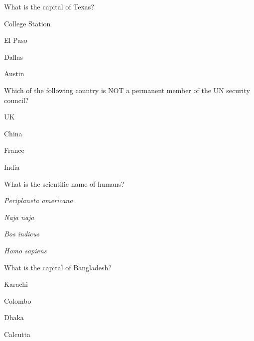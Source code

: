 \documentclass[12pt]{exam}
\begin{document}
\begin{questions}
    \question What is the capital of Texas?
    
        \begin{oneparchoices}
        
            \choice College Station
        
            \choice El Paso
        
            \choice Dallas
        
            \choice Austin
        
        \end{oneparchoices}

    \question Which of the following country is NOT a permanent member of the 
        UN security council?
    
        \begin{oneparchoices}
        
            \choice UK
        
            \choice China
        
            \choice France
        
            \choice India
        
        \end{oneparchoices}

    \question What is the scientific name of humans?
    
        \begin{oneparchoices}
        
            \choice \textit{Periplaneta americana}
        
            \choice \textit{Naja naja}
        
            \choice \textit{Bos indicus}
        
            \choice \textit{Homo sapiens}
        
        \end{oneparchoices}

    \question What is the capital of Bangladesh?
    
        \begin{oneparchoices}
        
            \choice Karachi
        
            \choice Colombo
        
            \choice Dhaka
        
            \choice Calcutta
        
        \end{oneparchoices}


\end{questions}
\end{document}
